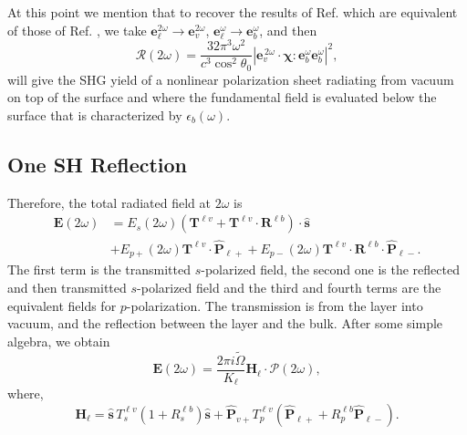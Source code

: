 At this point we mention that to recover the results of Ref. \cite{mizrahiJOSA88} which are equivalent of those of Ref. \cite{sipePRB87}, we take $\mathbf{e}^{2\omega}_{\ell}\to \mathbf{e}^{2\omega}_{v}$, $\mathbf{e}^{\omega}_{\ell}\to \mathbf{e}^{\omega}_{b}$, and then
\begin{equation}\label{m69}
\mathcal{R}(2\omega) =
\frac{32\pi^{3} \omega^{2}}{c^{3}\cos^{2}\theta_{0}}
\left\vert
\mathbf{e}^{\,2\omega}_{v}\cdot\boldsymbol{\chi}:
\mathbf{e}^{\omega}_{b}\mathbf{e}^{\omega}_{b}
\right\vert^{2} 
,
\end{equation}
will give the SHG yield of a nonlinear polarization sheet radiating from vacuum on top of the surface and where the fundamental field is evaluated below the surface that is characterized by $\epsilon_{b}(\omega)$.



\subsection{One SH Reflection}
Therefore, the total radiated field at $2\omega$ is
\begin{equation}\label{r7}
\begin{split}
\mathbf{E}(2\omega)  
&= E_{s}(2\omega)  
\left(
\mathbf{T}^{\ell v} + \mathbf{T}^{\ell v}\cdot\mathbf{R}^{\ell b}
\right)  
\cdot\hat{\mathbf{s}}\nonumber\\
&+ E_{p+}(2\omega)\mathbf{T}^{\ell v}\cdot\hat{\mathbf{P}}_{\ell +}
 + E_{p-}(2\omega)\mathbf{T}^{\ell v}
\cdot\mathbf{R}^{\ell b}\cdot\hat{\mathbf{P}}_{\ell-}.  
\end{split}
\end{equation} 
The first term is  the transmitted $s$-polarized field, the second one is the reflected and then transmitted $s$-polarized field and the third and fourth terms are the equivalent fields for $p$-polarization. The transmission is from the layer into vacuum, and the reflection between the layer and the bulk. After some simple algebra, we obtain
\begin{equation}\label{r8}
\mathbf{E}(2\omega) = \frac{2\pi i\tilde{\Omega}}{K_{\ell}}
\mathbf{H}_{\ell}\cdot\boldsymbol{\mathcal{P}}(2\omega),
\end{equation} 
where,
\begin{equation}\label{r9}
\mathbf{H}_{\ell}
= \hat{\mathbf{s}}\,T_{s}^{\ell v}\left(1+R_{s}^{\ell b}\right)\hat{\mathbf{s}}
+ \hat{\mathbf{P}}_{v+}T_{p}^{\ell v}
\left(
\hat{\mathbf{P}}_{\ell +} +R_{p}^{\ell b}\hat{\mathbf{P}}_{\ell -}
\right). 
\end{equation}


